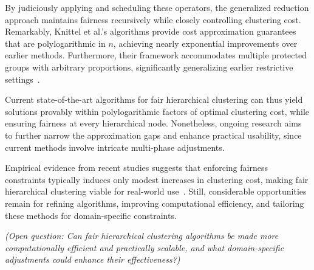 By judiciously applying and scheduling these operators, the generalized reduction approach maintains fairness recursively while closely controlling clustering cost. Remarkably, Knittel et al.’s algorithms provide cost approximation guarantees that are polylogarithmic in \( n \), achieving nearly exponential improvements over earlier methods. Furthermore, their framework accommodates multiple protected groups with arbitrary proportions, significantly generalizing earlier restrictive settings~\cite{knittel2023generalized}.

Current state-of-the-art algorithms for fair hierarchical clustering can thus yield solutions provably within polylogarithmic factors of optimal clustering cost, while ensuring fairness at every hierarchical node. Nonetheless, ongoing research aims to further narrow the approximation gaps and enhance practical usability, since current methods involve intricate multi-phase adjustments.

Empirical evidence from recent studies suggests that enforcing fairness constraints typically induces only modest increases in clustering cost, making fair hierarchical clustering viable for real-world use~\cite{ahmadian2020fairhc,knittel2023generalized}. Still, considerable opportunities remain for refining algorithms, improving computational efficiency, and tailoring these methods for domain-specific constraints.

\emph{(Open question: Can fair hierarchical clustering algorithms be made more computationally efficient and practically scalable, and what domain-specific adjustments could enhance their effectiveness?)}
